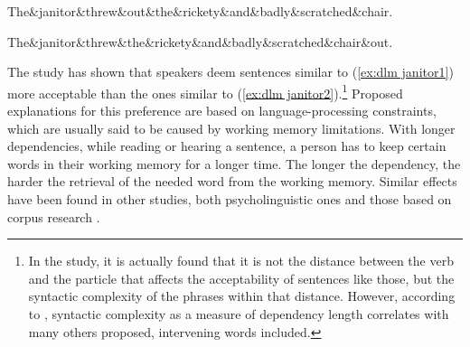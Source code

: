 \begin{exe}
    \ex\label{ex:dlm janitor}
    \begin{xlist}
    \ex\label{ex:dlm janitor1}
    \begin{dependency}[theme = simple, segmented edge, baseline=-\the\dimexpr\fontdimen22\textfont2\relax]
        \begin{deptext}
        The\&janitor\&threw\&out\&the\&rickety\&and\&badly\&scratched\&chair.\\
        \end{deptext}
    \end{dependency}

    \ex\label{ex:dlm janitor2}
    \begin{dependency}[theme = simple, segmented edge, edge height = 4ex, baseline=-\the\dimexpr\fontdimen22\textfont2\relax]
        \begin{deptext}
        The\&janitor\&threw\&the\&rickety\&and\&badly\&scratched\&chair\&out.\\
        \end{deptext}
    \end{dependency}
    \end{xlist}
\end{exe}

The study has shown that speakers deem sentences similar to (\ref{ex:dlm janitor1}) more acceptable than the ones similar to (\ref{ex:dlm janitor2}).\footnote{In the study, it is actually found that it is not the distance between the verb and the particle that affects the acceptability of sentences like those, but the syntactic complexity of the phrases within that distance. However, according to \cite{wasow2002postverbal}, syntactic complexity as a measure of dependency length correlates with many others proposed, intervening words included.} Proposed explanations for this preference are based on language-processing constraints, which are usually said to be caused by working memory limitations. With longer dependencies, while reading or hearing a sentence, a person has to keep certain words in their working memory for a longer time. The longer the dependency, the harder the retrieval of the needed word from the working memory. Similar effects have been found in other studies, both psycholinguistic ones \citep{KING1991580, GIBSON19981} and those based on corpus research \citep{gildea-temperley-2007-optimizing, gildea-temperley-2010, futrell2020, dyer-2023}. 

